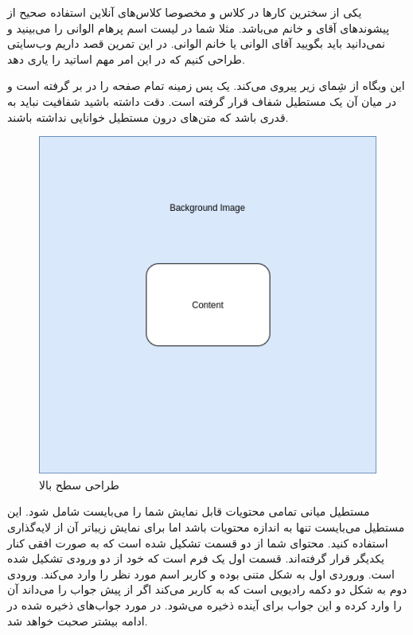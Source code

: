 \documentclass[../main.tex]{subfiles}
\begin{document}

یکی از سخترین کارها در کلاس و مخصوصا کلاس‌های آنلاین استفاده صحیح از پیشوندهای آقای و خانم می‌باشد.
مثلا شما در لیست اسم پرهام الوانی را می‌بینید و نمی‌دانید باید بگویید آقای الوانی یا خانم الوانی.
در این تمرین قصد داریم وب‌سایتی طراحی کنیم که در این امر مهم اساتید را یاری دهد.

این وبگاه از شِمای زیر پیروی می‌کند. یک پس زمینه تمام صفحه را در بر گرفته است و در میان آن یک مستطیل شفاف قرار گرفته است.
دقت داشته باشید شفافیت نباید به قدری باشد که متن‌های درون مستطیل خوانایی نداشته باشند.

\begin{figure}[h]
  \centering
  \includegraphics[scale=0.25]{./genderize-top-level}
  \caption{طراحی سطح بالا}
\end{figure}

مستطیل میانی تمامی محتویات قابل نمایش شما را می‌بایست شامل شود. این مستطیل می‌بایست تنها به اندازه محتویات باشد اما برای نمایش زیباتر آن از لایه‌گذاری استفاده کنید.
محتوای شما از دو قسمت تشکیل شده است که به صورت افقی کنار یکدیگر قرار گرفته‌اند. قسمت اول یک فرم است که خود از دو ورودی تشکیل شده است. وروردی اول به شکل متنی بوده و کاربر اسم مورد نظر را وارد می‌کند.
ورودی دوم به شکل دو دکمه رادیویی است که به کاربر می‌کند اگر از پیش جواب را می‌داند آن را وارد کرده و این جواب برای آینده ذخیره می‌شود. در مورد جواب‌های ذخیره شده در ادامه بیشتر صحبت خواهد شد.
\end{document}
